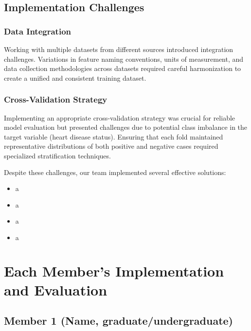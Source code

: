 \documentclass[11pt,a4paper]{article}
\begin{document}
\subsection{Implementation Challenges}

\subsubsection{Data Integration}
Working with multiple datasets from different sources introduced integration challenges. Variations in feature naming conventions, units of measurement, and data collection methodologies across datasets required careful harmonization to create a unified and consistent training dataset.

\subsubsection{Cross-Validation Strategy}
Implementing an appropriate cross-validation
strategy was crucial for reliable model evaluation but
presented challenges due to potential class imbalance in the
target variable (heart disease status).
Ensuring that each fold maintained representative
distributions of both positive and negative cases required
specialized stratification techniques.

\begin{tcolorbox}[infobox={Insights and Solutions}]
    Despite these challenges, our team implemented several effective solutions:
    \vspace{-0.25cm}
    \begin{itemize}
        \item a
        \item a
        \item a
        \item a
    \end{itemize}
\end{tcolorbox}

\section{Each Member's Implementation and Evaluation}

\subsection{Member 1 (Name, graduate/undergraduate)}
\end{document}
